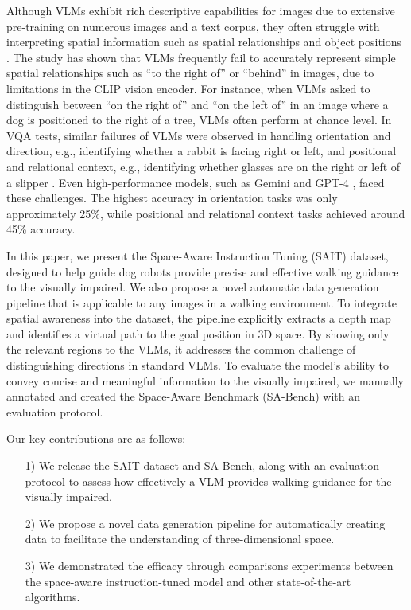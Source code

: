 Although VLMs exhibit rich descriptive capabilities for images due to extensive pre-training on numerous images and a text corpus, they often struggle with interpreting spatial information such as spatial relationships and object positions \cite{chen2024spatialvlm}.
The study \cite{Mert2023} has shown that VLMs frequently fail to accurately represent simple spatial relationships such as ``to the right of'' or ``behind'' in images, due to limitations in the CLIP vision encoder. 
For instance, when VLMs asked to distinguish between ``on the right of'' and ``on the left of'' in an image where a dog is positioned to the right of a tree, VLMs often perform at chance level. 
In VQA tests, similar failures of VLMs were observed in handling orientation and direction, e.g., identifying whether a rabbit is facing right or left, and positional and relational context, e.g., identifying whether glasses are on the right or left of a slipper \cite{Shengbang2024}. 
Even high-performance models, such as Gemini \cite{googleGemini} and GPT-4 \cite{openai2024gpt4technicalreport}, faced these challenges.
The highest accuracy in orientation tasks was only approximately 25\%, while positional and relational context tasks achieved around 45\% accuracy.

In this paper, we present the Space-Aware Instruction Tuning (SAIT) dataset, designed to help guide dog robots provide precise and effective walking guidance to the visually impaired. 
We also propose a novel automatic data generation pipeline that is applicable to any images in a walking environment. 
To integrate spatial awareness into the dataset, the pipeline explicitly extracts a depth map and identifies a virtual path to the goal position in 3D space. 
By showing only the relevant regions to the VLMs, it addresses the common challenge of distinguishing directions in standard VLMs.
To evaluate the model's ability to convey concise and meaningful information to the visually impaired, we manually annotated and created the Space-Aware Benchmark (SA-Bench) with an evaluation protocol.

Our key contributions are as follows:

\begin{itemize}
   \item[1)] We release the SAIT dataset and SA-Bench, along with an evaluation protocol to assess how effectively a VLM provides walking guidance for the visually impaired.
   \item[2)] We propose a novel data generation pipeline for automatically creating data to facilitate the understanding of three-dimensional space.
   \item[3)] We demonstrated the efficacy through comparisons experiments between the space-aware instruction-tuned model and other state-of-the-art algorithms.
\end{itemize}


